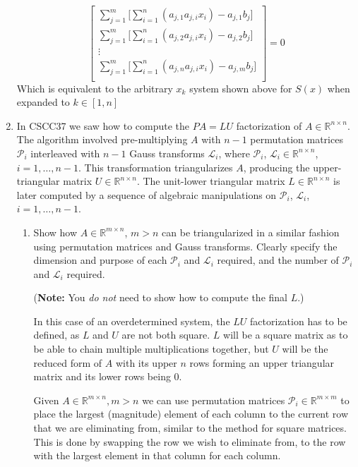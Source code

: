 \documentclass{article}
\newcommand{\rdim}[2]{\mathbb{R}^{#1 \times #2}}
\begin{document}
\begin{enumerate}
{\[\begin{bmatrix}
        \sum_{j=1}^m \Bigg[ \sum_{i=1}^n (a_{j,1}a_{j,i} x_{i}) - a_{j,1}b_j \Bigg]\\
        \sum_{j=1}^m \Bigg[ \sum_{i=1}^n (a_{j,2}a_{j,i} x_{i}) - a_{j,2}b_j \Bigg]\\
        \vdots \\
        \sum_{j=1}^m \Bigg[ \sum_{i=1}^n (a_{j,n}a_{j,i} x_{i}) - a_{j,m}b_j \Bigg]\\
    \end{bmatrix}
    = 0\]
    Which is equivalent to the arbitrary $x_k$ system shown above for $S(x)$ when expanded to $k \in [1,n]$
  }
  \newpage
  \item In CSCC37 we saw how to compute the $PA = LU$ factorization of $A \in \mathbb{R}^{n\times n}$. The algorithm involved pre-multiplying $A$ with $n-1$ permutation matrices $\mathcal{P}_i$ interleaved with $n-1$ Gauss transforms $\mathcal{L}_i$, where $\mathcal{P}_i$, $\mathcal{L}_i \in \mathbb{R}^{n\times n}$, $i= 1,\dots,n-1$. This transformation triangularizes $A$, producing the upper-triangular matrix $U \in \mathbb{R}^{n \times n}$. The unit-lower triangular matrix $L \in \mathbb{R}^{n \times n}$ is later computed by a sequence of algebraic manipulations on  $\mathcal{P}_i$, $\mathcal{L}_i $, $i = 1, \dots, n-1$.
  \begin{enumerate}
    \newcommand{\calP}{\mathcal{P}}
    \newcommand{\calL}{\mathcal{L}}
      \item Show how $A \in \mathbb{R}^{m \times n}$, $m>n$ can be triangularized in a similar fashion using permutation matrices and Gauss transforms. Clearly specify the dimension and purpose of each $\mathcal{P}_i$ and $\mathcal{L}_i$ required, and the number of $\mathcal{P}_i$ and $\mathcal{L}_i$ required.

      (\textbf{Note:} You \textit{do not} need to show how to compute the final $L$.)

        In this case of an overdetermined system, the $LU$ factorization has to be defined, as $L$ and $U$ are not both square. $L$ will be a square matrix as to be able to chain multiple multiplications together, but $U$ will be the reduced form of $A$ with its upper $n$ rows forming an upper triangular matrix and its lower rows being 0.
        
        Given $A \in \rdim{m}{n}, m > n$ we can use permutation matrices $\calP_i \in \rdim{m}{m}$ to place the largest (magnitude) element of each column to the current row that we are eliminating from, similar to the method for square matrices. This is done by swapping the row we wish to eliminate from, to the row with the largest element in that column for each column.
        

\end{enumerate}
\end{enumerate}
\end{document}
